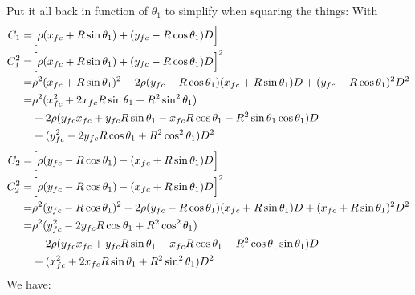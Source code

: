 \documentclass[12pt]{article}
\begin{document}
Put it all back in function of $\theta_1$ to simplify when squaring the things:
With
\begin{align}
    C_1 =& \Bigl[\rho(x_{fc} + R\sin\theta_1) + (y_{fc}-R\cos\theta_1)D\Bigr]\\
    C_1^2 =& \Bigl[\rho(x_{fc} + R\sin\theta_1) + (y_{fc}-R\cos\theta_1)D\Bigr]^2\\
    =& \rho^2(x_{fc} + R\sin\theta_1)^2 + 2\rho(y_{fc}-R\cos\theta_1)(x_{fc} + R\sin\theta_1)D + (y_{fc}-R\cos\theta_1)^2D^2\\
    =& \rho^2(x_{fc}^2 + 2x_{fc}R\sin\theta_1 + R^2\sin^2\theta_1) \nonumber\\
    &+ 2\rho(y_{fc}x_{fc} + y_{fc}R\sin\theta_1 -x_{fc}R\cos\theta_1 - R^2\sin\theta_1\cos\theta_1)D \nonumber\\
    &+ (y_{fc}^2 -2y_{fc}R\cos\theta_1 + R^2\cos^2\theta_1)D^2
\end{align}
\begin{align}
    C_2 =& \Bigl[\rho(y_{fc}-R\cos\theta_1) - (x_{fc} + R\sin\theta_1)D\Bigr]\\
    C_2^2 =& \Bigl[\rho(y_{fc}-R\cos\theta_1) - (x_{fc} + R\sin\theta_1)D\Bigr]^2\\
    =& \rho^2(y_{fc}-R\cos\theta_1)^2 - 2\rho(y_{fc}-R\cos\theta_1)(x_{fc} + R\sin\theta_1)D +(x_{fc} + R\sin\theta_1)^2D^2\\
    =& \rho^2(y_{fc}^2 -2y_{fc}R\cos\theta_1 + R^2\cos^2\theta_1) \nonumber\\
    &- 2\rho(y_{fc}x_{fc} + y_{fc}R\sin\theta_1 -x_{fc}R\cos\theta_1 -R^2\cos\theta_1\sin\theta_1)D \nonumber\\
    &+(x_{fc}^2 + 2x_{fc}R\sin\theta_1 + R^2\sin^2\theta_1)D^2
\end{align}
We have:
\end{document}
